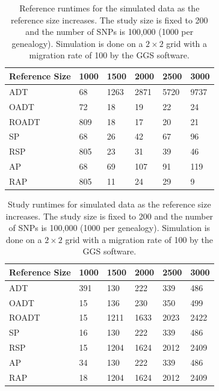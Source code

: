 \documentclass{article}
\begin{document}
\begin{table}
  \centering
  \begin{tabular}{|l|l|l|l|l|l|}
    \hline
    Reference Size & 1000 & 1500 & 2000 & 2500 & 3000 \\
    \hline
    ADT        &  68  & 1263 & 2871 & 5720 & 9737 \\
    OADT       &  72  & 18   & 19   & 22   & 24   \\
    ROADT      & 809  & 18   & 17   & 20   & 21   \\
    SP         &  68  & 26   & 42   & 67   & 96   \\
    RSP        & 805  & 23   & 31   & 39   & 46   \\
    AP         &  68  & 69   & 107  & 91   & 119  \\
    RAP        & 805  & 11   & 24   & 29   & 9    \\
    \hline
  \end{tabular}
  \caption{
    Reference runtimes for the simulated data as the reference size increases.
    The study size is fixed to 200 and the number of SNPs is 100,000 (1000 per genealogy). 
    Simulation is done on a $2 \times 2$ grid with a migration rate of 100 by the GGS software. 
  }
  \label{tbl:nChg-runtimes-ref}
\end{table}

\begin{table}
  \centering
  \begin{tabular}{|l|l|l|l|l|l|}
    \hline
    Reference Size & 1000 & 1500 & 2000 & 2500 & 3000 \\
    \hline
    ADT        & 391  &  130 &  222 &  339 &  486 \\
    OADT       & 15   &  136 &  230 &  350 &  499 \\
    ROADT      & 15   & 1211 & 1633 & 2023 & 2422 \\
    SP         & 16   &  130 &  222 &  339 &  486 \\
    RSP        & 15   & 1204 & 1624 & 2012 & 2409 \\
    AP         & 34   &  130 &  222 &  339 &  486 \\
    RAP        & 18   & 1204 & 1624 & 2012 & 2409 \\
    \hline
  \end{tabular}
  \caption{
    Study runtimes for simulated data as the reference size increases.
    The study size is fixed to 200 and the number of SNPs is 100,000 (1000 per genealogy). 
    Simulation is done on a $2 \times 2$ grid with a migration rate of 100 by the GGS software. 
  }
  \label{tbl:nChg-runtimes-study}
\end{table}
\end{document}
